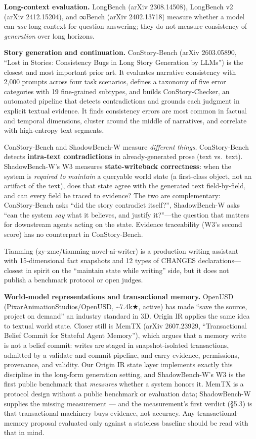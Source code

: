 \documentclass[
  english,
]{article}
\begin{document}
\textbf{Long-context evaluation.} LongBench (arXiv 2308.14508),
LongBench v2 (arXiv 2412.15204), and ∞Bench (arXiv 2402.13718) measure
whether a model can \emph{use} long context for question answering; they
do not measure consistency of \emph{generation} over long horizons.

\textbf{Story generation and continuation.} ConStory-Bench (arXiv
2603.05890, ``Lost in Stories: Consistency Bugs in Long Story Generation
by LLMs'') is the closest and most important prior art. It evaluates
narrative consistency with 2,000 prompts across four task scenarios,
defines a taxonomy of five error categories with 19 fine-grained
subtypes, and builds ConStory-Checker, an automated pipeline that
detects contradictions and grounds each judgment in explicit textual
evidence. It finds consistency errors are most common in factual and
temporal dimensions, cluster around the middle of narratives, and
correlate with high-entropy text segments.

ConStory-Bench and ShadowBench-W measure \emph{different things}.
ConStory-Bench detects \textbf{intra-text contradictions} in
already-generated prose (text vs.~text). ShadowBench-W's W3 measures
\textbf{state-writeback correctness}: when the system is \emph{required
to maintain} a queryable world state (a first-class object, not an
artifact of the text), does that state agree with the generated text
field-by-field, and can every field be traced to evidence? The two are
complementary: ConStory-Bench asks ``did the story contradict itself?'',
ShadowBench-W asks ``can the system \emph{say} what it believes, and
justify it?''---the question that matters for downstream agents acting
on the state. Evidence traceability (W3's second score) has no
counterpart in ConStory-Bench.

Tianming (zy-zmc/tianming-novel-ai-writer) is a production writing
assistant with 15-dimensional fact snapshots and 12 types of CHANGES
declarations---closest in spirit on the ``maintain state while writing''
side, but it does not publish a benchmark protocol or open judges.

\textbf{World-model representations and transactional memory.} OpenUSD
(PixarAnimationStudios/OpenUSD, \textasciitilde7.4k★, active) has made
``save the source, project on demand'' an industry standard in 3D.
Origin IR applies the same idea to textual world state. Closer still is
MemTX (arXiv 2607.23929, ``Transactional Belief Commit for Stateful
Agent Memory''), which argues that a memory write is not a belief
commit: writes are staged in snapshot-isolated transactions, admitted by
a validate-and-commit pipeline, and carry evidence, permissions,
provenance, and validity. Our Origin IR state layer implements exactly
this discipline in the long-form generation setting, and ShadowBench-W's
W3 is the first public benchmark that \emph{measures} whether a system
honors it. MemTX is a protocol design without a public benchmark or
evaluation data; ShadowBench-W supplies the missing measurement --- and
the measurement's first verdict (§5.3) is that transactional machinery
buys evidence, not accuracy. Any transactional-memory proposal evaluated
only against a stateless baseline should be read with that in mind.
\end{document}
